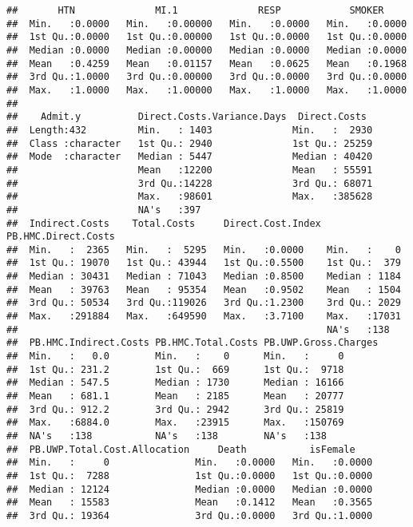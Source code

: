 \documentclass[]{article}
\begin{document}
\begin{verbatim}
##       HTN              MI.1              RESP            SMOKER      
##  Min.   :0.0000   Min.   :0.00000   Min.   :0.0000   Min.   :0.0000  
##  1st Qu.:0.0000   1st Qu.:0.00000   1st Qu.:0.0000   1st Qu.:0.0000  
##  Median :0.0000   Median :0.00000   Median :0.0000   Median :0.0000  
##  Mean   :0.4259   Mean   :0.01157   Mean   :0.0625   Mean   :0.1968  
##  3rd Qu.:1.0000   3rd Qu.:0.00000   3rd Qu.:0.0000   3rd Qu.:0.0000  
##  Max.   :1.0000   Max.   :1.00000   Max.   :1.0000   Max.   :1.0000  
##                                                                      
##    Admit.y          Direct.Costs.Variance.Days  Direct.Costs   
##  Length:432         Min.   : 1403              Min.   :  2930  
##  Class :character   1st Qu.: 2940              1st Qu.: 25259  
##  Mode  :character   Median : 5447              Median : 40420  
##                     Mean   :12200              Mean   : 55591  
##                     3rd Qu.:14228              3rd Qu.: 68071  
##                     Max.   :98601              Max.   :385628  
##                     NA's   :397                                
##  Indirect.Costs    Total.Costs     Direct.Cost.Index PB.HMC.Direct.Costs
##  Min.   :  2365   Min.   :  5295   Min.   :0.0000    Min.   :    0      
##  1st Qu.: 19070   1st Qu.: 43944   1st Qu.:0.5500    1st Qu.:  379      
##  Median : 30431   Median : 71043   Median :0.8500    Median : 1184      
##  Mean   : 39763   Mean   : 95354   Mean   :0.9502    Mean   : 1504      
##  3rd Qu.: 50534   3rd Qu.:119026   3rd Qu.:1.2300    3rd Qu.: 2029      
##  Max.   :291884   Max.   :649590   Max.   :3.7100    Max.   :17031      
##                                                      NA's   :138        
##  PB.HMC.Indirect.Costs PB.HMC.Total.Costs PB.UWP.Gross.Charges
##  Min.   :   0.0        Min.   :    0      Min.   :     0      
##  1st Qu.: 231.2        1st Qu.:  669      1st Qu.:  9718      
##  Median : 547.5        Median : 1730      Median : 16166      
##  Mean   : 681.1        Mean   : 2185      Mean   : 20777      
##  3rd Qu.: 912.2        3rd Qu.: 2942      3rd Qu.: 25819      
##  Max.   :6884.0        Max.   :23915      Max.   :150769      
##  NA's   :138           NA's   :138        NA's   :138         
##  PB.UWP.Total.Cost.Allocation     Death           isFemale     
##  Min.   :     0               Min.   :0.0000   Min.   :0.0000  
##  1st Qu.:  7288               1st Qu.:0.0000   1st Qu.:0.0000  
##  Median : 12124               Median :0.0000   Median :0.0000  
##  Mean   : 15583               Mean   :0.1412   Mean   :0.3565  
##  3rd Qu.: 19364               3rd Qu.:0.0000   3rd Qu.:1.0000  

\end{verbatim}
\end{document}
